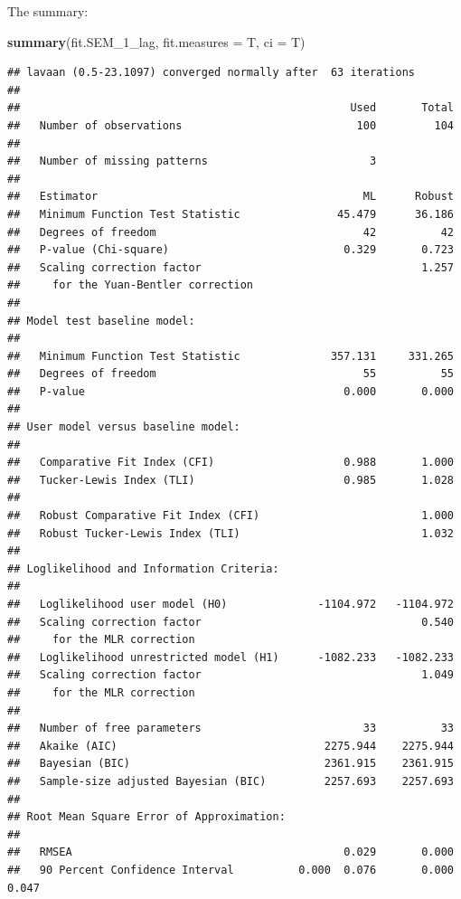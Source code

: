 \documentclass[]{article}
\newenvironment{Shaded}{\begin{snugshade}}{\end{snugshade}}
\newcommand{\KeywordTok}[1]{\textcolor[rgb]{0.13,0.29,0.53}{\textbf{#1}}}
\newcommand{\DataTypeTok}[1]{\textcolor[rgb]{0.13,0.29,0.53}{#1}}
\newcommand{\NormalTok}[1]{#1}
\begin{document}
The summary:

\begin{Shaded}
\begin{Highlighting}[]
\KeywordTok{summary}\NormalTok{(fit.SEM_1_lag, }
        \DataTypeTok{fit.measures =}\NormalTok{ T,}
        \DataTypeTok{ci =}\NormalTok{ T)}
\end{Highlighting}
\end{Shaded}

\begin{verbatim}
## lavaan (0.5-23.1097) converged normally after  63 iterations
## 
##                                                   Used       Total
##   Number of observations                           100         104
## 
##   Number of missing patterns                         3
## 
##   Estimator                                         ML      Robust
##   Minimum Function Test Statistic               45.479      36.186
##   Degrees of freedom                                42          42
##   P-value (Chi-square)                           0.329       0.723
##   Scaling correction factor                                  1.257
##     for the Yuan-Bentler correction
## 
## Model test baseline model:
## 
##   Minimum Function Test Statistic              357.131     331.265
##   Degrees of freedom                                55          55
##   P-value                                        0.000       0.000
## 
## User model versus baseline model:
## 
##   Comparative Fit Index (CFI)                    0.988       1.000
##   Tucker-Lewis Index (TLI)                       0.985       1.028
## 
##   Robust Comparative Fit Index (CFI)                         1.000
##   Robust Tucker-Lewis Index (TLI)                            1.032
## 
## Loglikelihood and Information Criteria:
## 
##   Loglikelihood user model (H0)              -1104.972   -1104.972
##   Scaling correction factor                                  0.540
##     for the MLR correction
##   Loglikelihood unrestricted model (H1)      -1082.233   -1082.233
##   Scaling correction factor                                  1.049
##     for the MLR correction
## 
##   Number of free parameters                         33          33
##   Akaike (AIC)                                2275.944    2275.944
##   Bayesian (BIC)                              2361.915    2361.915
##   Sample-size adjusted Bayesian (BIC)         2257.693    2257.693
## 
## Root Mean Square Error of Approximation:
## 
##   RMSEA                                          0.029       0.000
##   90 Percent Confidence Interval          0.000  0.076       0.000  0.047

\end{verbatim}
\end{document}
